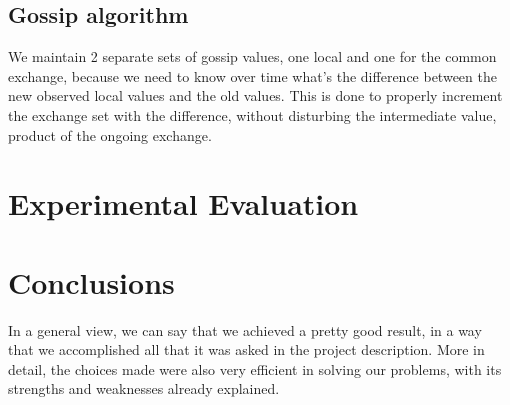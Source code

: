 \documentclass[times,9pt,article]{llncs}
\begin{document}
\subsection{Gossip algorithm}
We maintain 2 separate sets of gossip values, one local and one for the common exchange, because we need to know over time what's the difference between the new observed local values and the old values. This is done to properly increment the exchange set with the difference, without disturbing the intermediate value, product of the ongoing exchange.


\section{Experimental Evaluation}


\section{Conclusions}
In a general view, we can say that we achieved a pretty good result, in a way that we accomplished all that it was asked in the project description.
More in detail, the choices made were also very efficient in solving our problems, with its strengths and weaknesses already explained.
\end{document}
